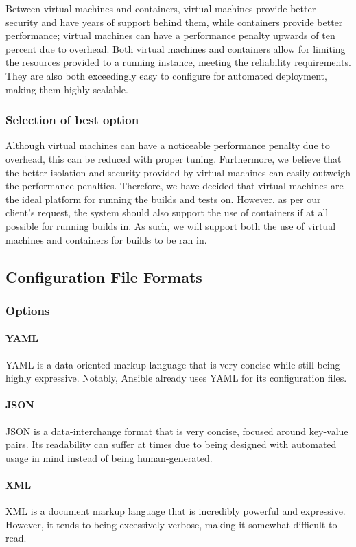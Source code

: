 \documentclass[10pt,letterpaper,onecolumn,draftclsnofoot]{IEEEtran}
\begin{document}
Between virtual machines and containers, virtual machines provide better security and have years of support behind them, while containers provide better performance; virtual machines can have a performance penalty upwards of ten percent due to overhead.\cite{RC25482} Both virtual machines and containers allow for limiting the resources provided to a running instance, meeting the reliability requirements. They are also both exceedingly easy to configure for automated deployment, making them highly scalable.
\subsubsection{Selection of best option}
Although virtual machines can have a noticeable performance penalty due to overhead, this can be reduced with proper tuning. Furthermore, we believe that the better isolation and security provided by virtual machines can easily outweigh the performance penalties. Therefore, we have decided that virtual machines are the ideal platform for running the builds and tests on. However, as per our client's request, the system should also support the use of containers if at all possible for running builds in. As such, we will support both the use of virtual machines and containers for builds to be ran in.

\subsection{Configuration File Formats}
\subsubsection{Options}
\paragraph{YAML}
YAML is a data-oriented markup language that is very concise while still being highly expressive. Notably, Ansible already uses YAML for its configuration files.
\paragraph{JSON}
JSON is a data-interchange format that is very concise, focused around key-value pairs. Its readability can suffer at times due to being designed with automated usage in mind instead of being human-generated.
\paragraph{XML}
XML is a document markup language that is incredibly powerful and expressive. However, it tends to being excessively verbose, making it somewhat difficult to read.
\end{document}
